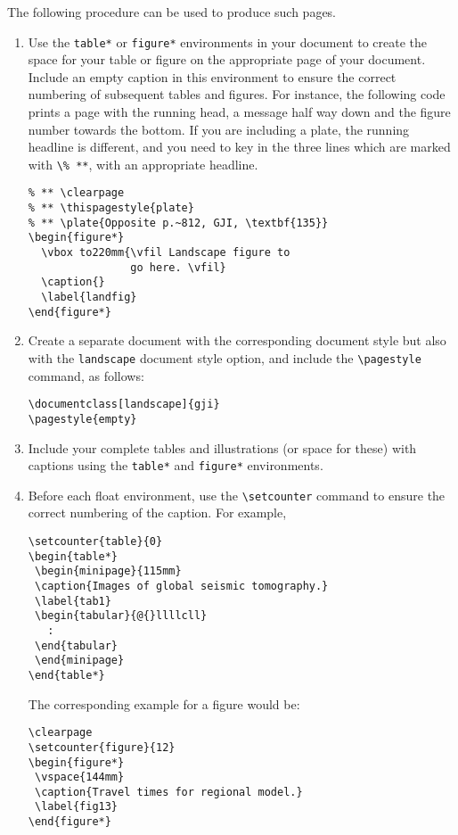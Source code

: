 The following procedure can be used to produce such pages.
\begin{enumerate}
  \item Use the \verb"table*" or \verb"figure*" environments in your
        document to create the space for your table or figure on the
        appropriate page of your document. Include an empty
        caption in this environment to ensure the correct
        numbering of subsequent tables and figures. For instance, the
        following code prints a page with the running head, a message
        half way down and the figure number towards the bottom. If you
        are including a plate, the running headline is different, and you
        need to key in the three lines which are marked with \verb"\% **",
        with an appropriate headline.
\begin{verbatim}
% ** \clearpage
% ** \thispagestyle{plate}
% ** \plate{Opposite p.~812, GJI, \textbf{135}}
\begin{figure*}
  \vbox to220mm{\vfil Landscape figure to
                go here. \vfil}
  \caption{}
  \label{landfig}
\end{figure*}
\end{verbatim}
\item Create a separate document with the corresponding document style
      but also with the \verb"landscape" document style option, and
      include the \verb"\pagestyle" command, as follows:
\begin{verbatim}
\documentclass[landscape]{gji}
\pagestyle{empty}
\end{verbatim}
  \item Include your complete tables and illustrations (or space for
        these) with captions using the \verb"table*" and \verb"figure*"
        environments.
  \item Before each float environment, use the
        \verb"\setcounter" command to ensure the correct numbering of
        the caption. For example,
\begin{verbatim}
\setcounter{table}{0}
\begin{table*}
 \begin{minipage}{115mm}
 \caption{Images of global seismic tomography.}
 \label{tab1}
 \begin{tabular}{@{}llllcll}
   :
 \end{tabular}
 \end{minipage}
\end{table*}
\end{verbatim}
The corresponding example for a figure would be:
\begin{verbatim}
\clearpage
\setcounter{figure}{12}
\begin{figure*}
 \vspace{144mm}
 \caption{Travel times for regional model.}
 \label{fig13}
\end{figure*}
\end{verbatim}
\end{enumerate}



